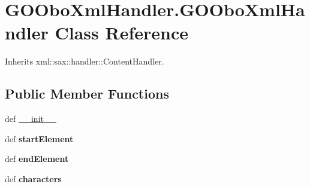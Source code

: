 \hypertarget{class_g_o_obo_xml_handler_1_1_g_o_obo_xml_handler}{
\section{GOOboXmlHandler.GOOboXmlHandler Class Reference}
\label{class_g_o_obo_xml_handler_1_1_g_o_obo_xml_handler}
}


Inherits xml::sax::handler::ContentHandler.

\subsection*{Public Member Functions}
\begin{DoxyCompactItemize}
\item 
def \hyperlink{class_g_o_obo_xml_handler_1_1_g_o_obo_xml_handler_a8317674e5f4b100aabbe53ddf368bb26}{\_\-\_\-init\_\-\_\-}
\item 
\hypertarget{class_g_o_obo_xml_handler_1_1_g_o_obo_xml_handler_acf717862e0d74ded0ba251edf98d52af}{
def {\bfseries startElement}}
\label{class_g_o_obo_xml_handler_1_1_g_o_obo_xml_handler_acf717862e0d74ded0ba251edf98d52af}

\item 
\hypertarget{class_g_o_obo_xml_handler_1_1_g_o_obo_xml_handler_ab7da652c8f67bc009e89925f40c4a3dd}{
def {\bfseries endElement}}
\label{class_g_o_obo_xml_handler_1_1_g_o_obo_xml_handler_ab7da652c8f67bc009e89925f40c4a3dd}

\item 
\hypertarget{class_g_o_obo_xml_handler_1_1_g_o_obo_xml_handler_a46b9cda18213754ee2a48ed5a480324d}{
def {\bfseries characters}}
\label{class_g_o_obo_xml_handler_1_1_g_o_obo_xml_handler_a46b9cda18213754ee2a48ed5a480324d}

\end{DoxyCompactItemize}
